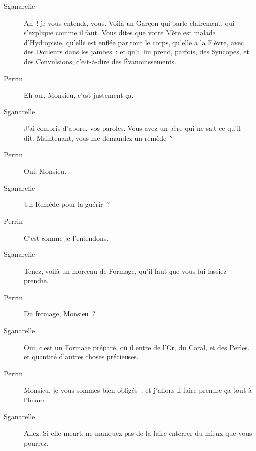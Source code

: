 \documentclass[french,twoside]{book} %
\begin{document}
 \begin{description} \item[Sganarelle] 

Ah ! je vous entends, vous. Voilà un Garçon qui parle clairement, qui s’explique comme il faut. Vous dites que votre Mère est malade d’Hydropisie, qu’elle est enflée par tout le corps, qu’elle a la Fièvre, avec des Douleurs dans les jambes : et qu’il lui prend, parfois, des Syncopes, et des Convulsions, c’est-à-dire des Évanouissements.\end{description}
 \begin{description} \item[Perrin] 

Eh oui, Monsieu, c’est justement ça.\end{description}
 \begin{description} \item[Sganarelle] 

J’ai compris d’abord, vos paroles. Vous avez un père qui ne sait ce qu’il dit. Maintenant, vous me demandez un remède ?\end{description}
 \begin{description} \item[Perrin] 

Oui, Monsieu.\end{description}
 \begin{description} \item[Sganarelle] 

Un Remède pour la guérir ?\end{description}
 \begin{description} \item[Perrin] 

C’est comme je l’entendons.\end{description}
 \begin{description} \item[Sganarelle] 

Tenez, voilà un morceau de Formage, qu’il faut que vous lui fassiez prendre.\end{description}
 \begin{description} \item[Perrin] 

Du fromage, Monsieu ?\end{description}
 \begin{description} \item[Sganarelle] 

Oui, c’est un Formage préparé, où il entre de l’Or, du Coral, et des Perles, et quantité d’autres choses précieuses.\end{description}
 \begin{description} \item[Perrin] 

Monsieu, je vous sommes bien obligés : et j’allons li faire prendre ça tout à l’heure.\end{description}
 \begin{description} \item[Sganarelle] 

Allez. Si elle meurt, ne manquez pas de la faire enterrer du mieux que vous pourrez.\end{description}
\end{document}
